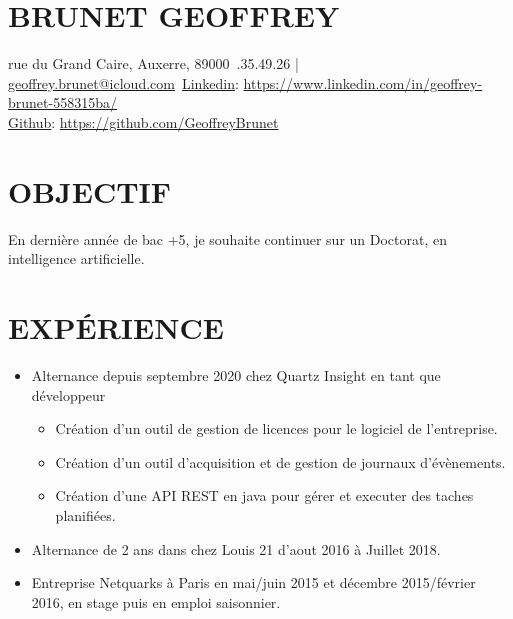 \documentclass[a4paper,twoside]{article}
\begin{document}
\begin{multicols}{2}

    \section*{BRUNET GEOFFREY}

     rue du Grand Caire, Auxerre, 89000\ .35.49.26 | \href{mailto:geoffrey-brunet89@outlook.fr}{geoffrey.brunet@icloud.com}\
    \href{https://www.linkedin.com/in/geoffrey-brunet-558315ba/}{Linkedin}: \url{https://www.linkedin.com/in/geoffrey-brunet-558315ba/}\\
    \href{https://github.com/GeoffreyBrunet}{Github}: \url{https://github.com/GeoffreyBrunet}

    \section*{OBJECTIF}

    \noindent En dernière année de bac +5, je souhaite continuer sur un Doctorat, en intelligence artificielle.

    \section*{EXPÉRIENCE}

    \begin{itemize}
        \item Alternance depuis septembre 2020 chez Quartz Insight en tant que développeur
              \begin{itemize}
                  \item Création d'un outil de gestion de licences pour le logiciel de l'entreprise.
                  \item Création d'un outil d'acquisition et de gestion de journaux d'évènements.
                  \item Création d'une API REST en java pour gérer et executer des taches planifiées.
              \end{itemize}
        \item Alternance de 2 ans dans chez Louis 21 d’aout 2016 à Juillet 2018.
        \item Entreprise Netquarks à Paris en mai/juin 2015 et décembre 2015/février 2016, en stage puis en emploi saisonnier.
    \end{itemize}


\end{multicols}
\end{document}
